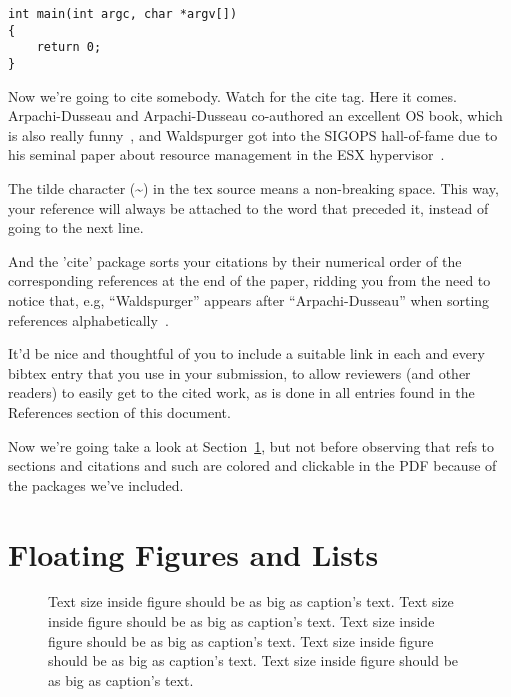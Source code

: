 \begin{verbatim}
int main(int argc, char *argv[]) 
{
    return 0;
}
\end{verbatim}

Now we're going to cite somebody. Watch for the cite tag. Here it
comes. Arpachi-Dusseau and Arpachi-Dusseau co-authored an excellent OS
book, which is also really funny~\cite{arpachiDusseau18:osbook}, and
Waldspurger got into the SIGOPS hall-of-fame due to his seminal paper
about resource management in the ESX hypervisor~\cite{waldspurger02}.

The tilde character (\~{}) in the tex source means a non-breaking
space. This way, your reference will always be attached to the word
that preceded it, instead of going to the next line.

And the 'cite' package sorts your citations by their numerical order
of the corresponding references at the end of the paper, ridding you
from the need to notice that, e.g, ``Waldspurger'' appears after
``Arpachi-Dusseau'' when sorting references
alphabetically~\cite{waldspurger02,arpachiDusseau18:osbook}. 

It'd be nice and thoughtful of you to include a suitable link in each
and every bibtex entry that you use in your submission, to allow
reviewers (and other readers) to easily get to the cited work, as is
done in all entries found in the References section of this document.

Now we're going take a look at Section~\ref{sec:figs}, but not before
observing that refs to sections and citations and such are colored and
clickable in the PDF because of the packages we've included.

\section{Floating Figures and Lists}
\label{sec:figs}


\begin{figure}
\begin{center}
\end{center}
\caption{\label{fig:vectors} Text size inside figure should be as big as
  caption's text. Text size inside figure should be as big as
  caption's text. Text size inside figure should be as big as
  caption's text. Text size inside figure should be as big as
  caption's text. Text size inside figure should be as big as
  caption's text. }
\end{figure}


